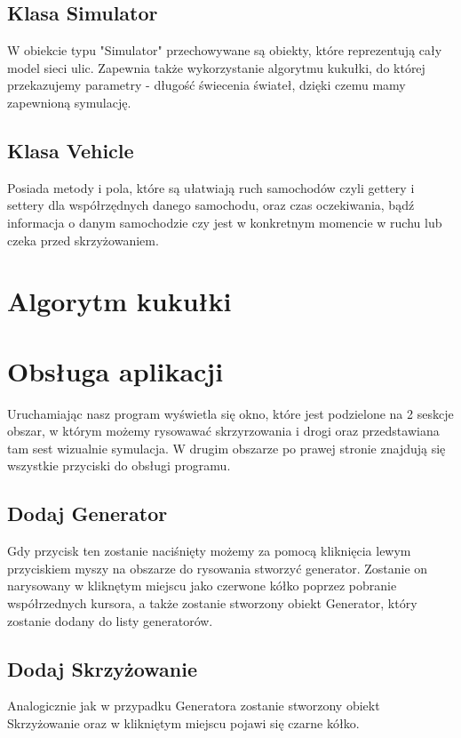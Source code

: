 \documentclass{article}
\begin{document}
\subsection{Klasa Simulator}
    W obiekcie typu "Simulator" przechowywane są obiekty, które reprezentują cały model sieci ulic. Zapewnia także wykorzystanie algorytmu kukułki, do której przekazujemy parametry - długość świecenia świateł, dzięki czemu mamy zapewnioną symulację.

\subsection{Klasa Vehicle}
    Posiada metody i pola, które są ułatwiają ruch samochodów czyli gettery i settery dla współrzędnych danego samochodu, oraz czas oczekiwania, bądź informacja o danym samochodzie czy jest w konkretnym momencie w ruchu lub czeka przed skrzyżowaniem.

\section{Algorytm kukułki}

\section{Obsługa aplikacji}
    Uruchamiając nasz program wyświetla się okno, które jest podzielone na 2 seskcje obszar, w którym możemy rysowawać skrzyrzowania i drogi oraz przedstawiana tam sest wizualnie symulacja. W drugim obszarze po prawej stronie znajdują się wszystkie przyciski do obsługi programu.

\subsection{Dodaj Generator}
    Gdy przycisk ten zostanie naciśnięty możemy za pomocą kliknięcia lewym przyciskiem myszy na obszarze do rysowania stworzyć generator. Zostanie on narysowany w kliknętym miejscu jako czerwone kółko poprzez pobranie współrzednych kursora, a także zostanie stworzony obiekt Generator, który zostanie dodany do listy generatorów.

\subsection{Dodaj Skrzyżowanie}
    Analogicznie jak w przypadku Generatora zostanie stworzony obiekt Skrzyżowanie oraz w klikniętym miejscu pojawi się czarne kółko.
\end{document}
